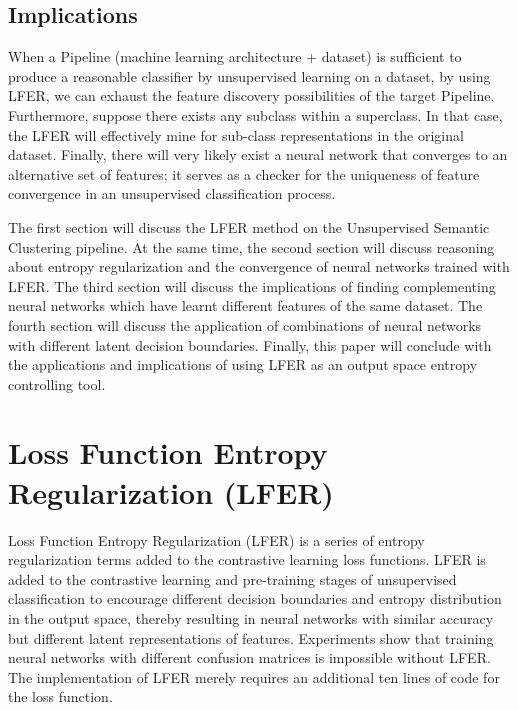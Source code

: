 \documentclass[journal]{journal}
\begin{document}
\subsection{Implications} 
When a Pipeline (machine learning architecture + dataset) is sufficient to produce a reasonable classifier by unsupervised learning on a dataset, by using LFER, we can exhaust the feature discovery possibilities of the target Pipeline. Furthermore, suppose there exists any subclass within a superclass. In that case, the LFER will effectively mine for sub-class representations in the original dataset. Finally, there will very likely exist a neural network that converges to an alternative set of features; it serves as a checker for the uniqueness of feature convergence in an unsupervised classification process. 


The first section will discuss the LFER method on the Unsupervised Semantic Clustering pipeline. At the same time, the second section will discuss reasoning about entropy regularization and the convergence of neural networks trained with LFER. The third section will discuss the implications of finding complementing neural networks which have learnt different features of the same dataset. The fourth section will discuss the application of combinations of neural networks with different latent decision boundaries. Finally, this paper will conclude with the applications and implications of using LFER as an output space entropy controlling tool. 

\section{Loss Function Entropy Regularization (LFER) }

Loss Function Entropy Regularization (LFER) is a series of entropy regularization terms added to the contrastive learning loss functions. LFER is added to the contrastive learning and pre-training stages of unsupervised classification to encourage different decision boundaries and entropy distribution in the output space, thereby resulting in neural networks with similar accuracy but different latent representations of features. Experiments show that training neural networks with different confusion matrices is impossible without LFER. The implementation of LFER merely requires an additional ten lines of code for the loss function. 
\end{document}
